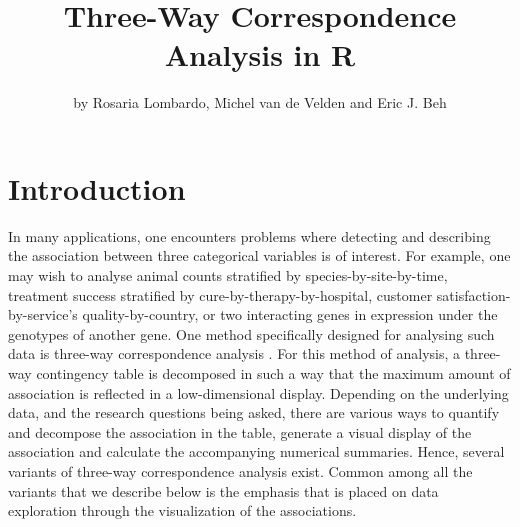 \title{Three-Way Correspondence Analysis in R} 
\author{by Rosaria Lombardo, Michel van de Velden and Eric J. Beh}

\maketitle


\section{Introduction}
In many applications, one encounters problems where detecting and describing the association between three categorical variables is of interest. For example, one may wish to analyse animal counts stratified by species-by-site-by-time, treatment success stratified by cure-by-therapy-by-hospital, customer satisfaction-by-service's quality-by-country, or two interacting genes in expression under the genotypes of another gene. One method specifically designed for analysing such data is three-way correspondence analysis \cite[]{carkro96}. For this method of analysis, a three-way contingency table is decomposed in such a way that the maximum amount of association is reflected in a low-dimensional display. Depending on the underlying data, and the research questions being asked, there are various ways to quantify and decompose the association in the table, generate a visual display of the association and calculate the accompanying numerical summaries. Hence, several variants of three-way correspondence analysis exist. Common among all the variants that we describe below is the emphasis that is placed on data exploration through the visualization of the associations. 

